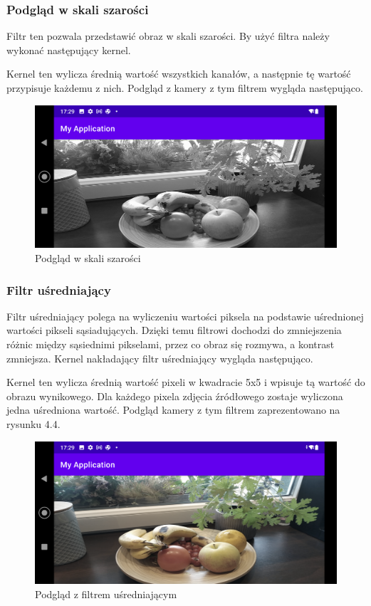 \subsubsection[Podgląd w skali szarości]{Podgląd w skali szarości}
Filtr ten pozwala przedstawić obraz w skali szarości. By użyć filtra należy wykonać następujący kernel.

Kernel ten wylicza średnią wartość wszystkich kanałów, a następnie tę wartość przypisuje każdemu z nich. Podgląd z kamery z tym filtrem wygląda następująco.
\begin{figure}[H]
	\includegraphics[scale=0.16]{imgs/BlackWhite.png}
	\caption{Podgląd w skali szarości}
\end{figure}
\subsubsection[Filtr uśredniający]{Filtr uśredniający}
Filtr uśredniający polega na wyliczeniu wartości piksela na podstawie uśrednionej wartości pikseli sąsiadujących. Dzięki temu filtrowi dochodzi do zmniejszenia różnic między sąsiednimi pikselami, przez co obraz się rozmywa, a kontrast zmniejsza. Kernel nakładający filtr uśredniający wygląda następująco.

Kernel ten wylicza średnią wartość pixeli w kwadracie 5x5 i wpisuje tą wartość do obrazu wynikowego. Dla każdego pixela zdjęcia źródłowego zostaje wyliczona jedna uśredniona wartość. Podgląd kamery z tym filtrem zaprezentowano na rysunku 4.4.
\begin{figure}[H]
	\includegraphics[scale=0.16]{imgs/avgFilter.png}
	\caption{Podgląd z filtrem uśredniającym}
\end{figure}
